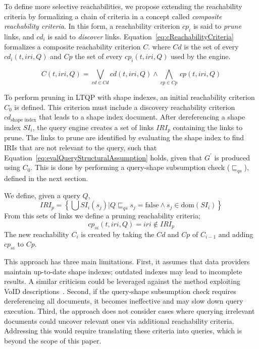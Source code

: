 To define more selective reachabilities, we propose extending the reachability criteria by formalizing a chain of criteria in a concept called \emph{composite reachability criteria}.
In this form, a reachability criterion $cp_i$ is said to \emph{prune} links, and $cd_i$ is said to \emph{discover} links.
Equation~\ref{eq:cReachabilityCriteria} formalizes a composite reachability criterion $C$.
where $Cd$ is the set of every $cd_i(t, iri, Q)$ and $Cp$ the set of every $cp_i(t, iri, Q)$ used by the engine.

\begin{equation}\label{eq:cReachabilityCriteria}
   C(t, iri, Q) = \bigvee_{cd \in Cd} cd(t, iri, Q) \mathrel{\land} \bigwedge_{cp \in Cp} \, cp(t, iri, Q)
\end{equation}

To perform pruning in LTQP with shape indexes, an initial reachability criterion $C_0$ is defined.
This criterion must include a discovery reachability criterion $cd_{\text{shape index}}$ that leads to a shape index document.  
After dereferencing a shape index $SI_i$, the query engine creates a set of links $IRI_p$ containing the links to prune.  
The links to prune are identified by evaluating the shape index to find IRIs that are not relevant to the query, such that Equation~\ref{eq:evalQueryStructuralAssumption} holds, given that $G^{\prime}$ is produced using $C_0$.  
This is done by performing a query-shape subsumption check ($\sqsubseteq_{qs}$), defined in the next section.

We define, given a query $Q$,
$$
IRI_p = \left\{ \bigcup SI_i(s_j) | Q \sqsubseteq_{qs}  s_j = \mathrm{false} \land s_j \in \text{dom}(SI_i) \right\}
$$
From this sets of links we define a pruning reachability criteria;
\begin{equation}
       cp_{si}(t, iri, Q) = iri \notin IRI_p
\end{equation}
The new reachability $C_i$ is created by taking the $Cd$ and $Cp$ of $C_{i-1}$ and adding $cp_{si}$ to $Cp$.

This approach has three main limitations.  
First, it assumes that data providers maintain up-to-date shape indexes; outdated indexes may lead to incomplete results.
A similar criticism could be leveraged against the method exploiting VoID descriptions~\cite{Montoya2017}.
Second, if the query-shape subsumption check requires dereferencing all documents, it becomes ineffective and may slow down query execution.  
Third, the approach does not consider cases where querying irrelevant documents could uncover relevant ones via additional reachability criteria.  
Addressing this would require translating these criteria into queries, which is beyond the scope of this paper.

